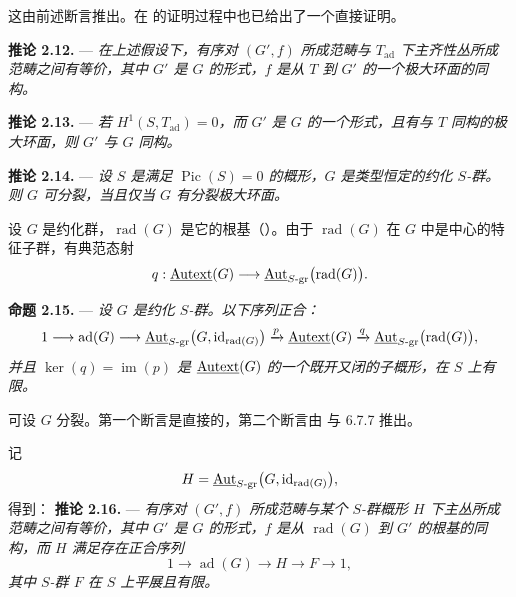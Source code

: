 这由前述断言推出。在  的证明过程中也已给出了一个直接证明。

\medskip\noindent\textbf{推论 2.12.} ---
{\itshape 在上述假设下，有序对 \((G',f)\) 所成范畴与 \(T_{\mathrm{ad}}\) 下主齐性丛所成范畴之间有等价，其中 \(G'\) 是 \(G\) 的形式，\(f\) 是从 \(T\) 到 \(G'\) 的一个极大环面的同构。}

\medskip\noindent\textbf{推论 2.13.} ---
{\itshape 若 \(H^1(S,T_{\mathrm{ad}})=0\)，而 \(G'\) 是 \(G\) 的一个形式，且有与 \(T\) 同构的极大环面，则 \(G'\) 与 \(G\) 同构。}

\medskip\noindent\textbf{推论 2.14.} ---
{\itshape 设 \(S\) 是满足 \(\operatorname{Pic}(S)=0\) 的概形，\(G\) 是类型恒定的约化 \(S\)-群。则 \(G\) 可分裂，当且仅当 \(G\) 有分裂极大环面。}

设 \(G\) 是约化群，\(\operatorname{rad}(G)\) 是它的根基（）。由于 \(\operatorname{rad}(G)\) 在 \(G\) 中是中心的特征子群，有典范态射
\[
  q:\underline{\operatorname{Autext}}(G)
  \longrightarrow
  \underline{\operatorname{Aut}}_{S\text{-}\mathrm{gr}}
    \bigl(\operatorname{rad}(G)\bigr).
\]

\medskip\noindent\textbf{命题 2.15.} ---
{\itshape 设 \(G\) 是约化 \(S\)-群。以下序列正合：}
\[
  1\longrightarrow
  \operatorname{ad}(G)
  \longrightarrow
  \underline{\operatorname{Aut}}_{S\text{-}\mathrm{gr}}
    \bigl(G,\operatorname{id}_{\operatorname{rad}(G)}\bigr)
  \xrightarrow{p}
  \underline{\operatorname{Autext}}(G)
  \xrightarrow{q}
  \underline{\operatorname{Aut}}_{S\text{-}\mathrm{gr}}
    \bigl(\operatorname{rad}(G)\bigr),
\]
{\itshape 并且 \(\ker(q)=\operatorname{im}(p)\) 是 \(\underline{\operatorname{Autext}}(G)\) 的一个既开又闭的子概形，在 \(S\) 上有限。}

可设 \(G\) 分裂。第一个断言是直接的，第二个断言由 与 6.7.7 推出。

记
\[
  H=
  \underline{\operatorname{Aut}}_{S\text{-}\mathrm{gr}}
    \bigl(G,\operatorname{id}_{\operatorname{rad}(G)}\bigr),
\]
得到：
\medskip\noindent\textbf{推论 2.16.} ---
{\itshape 有序对 \((G',f)\) 所成范畴与某个 \(S\)-群概形 \(H\) 下主丛所成范畴之间有等价，其中 \(G'\) 是 \(G\) 的形式，\(f\) 是从 \(\operatorname{rad}(G)\) 到 \(G'\) 的根基的同构，而 \(H\) 满足存在正合序列}
\[
  1\longrightarrow \operatorname{ad}(G)
  \longrightarrow H
  \longrightarrow F
  \longrightarrow 1,
\]
{\itshape 其中 \(S\)-群 \(F\) 在 \(S\) 上平展且有限。}

